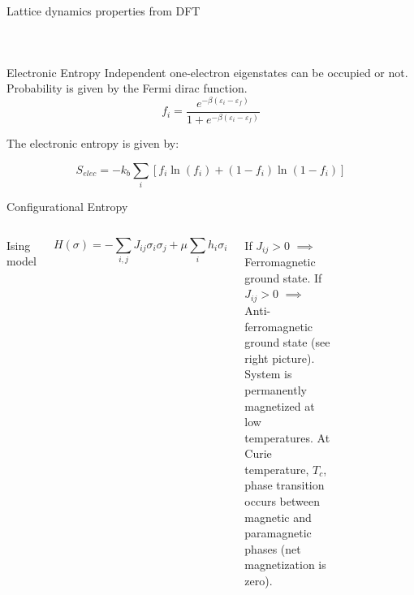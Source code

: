 \documentclass[aspectratio=169]{beamer}
\begin{document}
\begin{frame}{Lattice dynamics properties from DFT}
\begin{columns}
\begin{figure}
\end{figure} 

\end{columns} 

\end{frame} 

\begin{frame}{Electronic Entropy}
Independent one-electron eigenstates can be occupied or not. Probability is given by the Fermi dirac function.
\begin{equation*}
f_i = \frac{e^{-\beta(\varepsilon_i-\varepsilon_f)}}{1+e^{-\beta(\varepsilon_i-\varepsilon_f)}}
\end{equation*} 

The electronic entropy is given by:

\begin{equation*}
S_{elec} = -k_b \sum_i \left[ f_i \ln(f_i) + (1-f_i) \ln(1-f_i)\right]
\end{equation*} 
\end{frame} 

\begin{frame}{Configurational Entropy}

\begin{columns}
Ising model

\begin{equation*}
H(\sigma) = -\sum_{i,j} J_{ij} \sigma_i \sigma_j + \mu \sum_i h_i \sigma_i
\end{equation*} 

If $J_{ij} > 0$ $\implies$ Ferromagnetic ground state.\newline
\newline 
If $J_{ij} > 0$ $\implies$ Anti-ferromagnetic ground state (see right picture).\newline
\newline 
System is permanently magnetized at low temperatures.\newline
\newline 
At Curie temperature, $T_c$, phase transition occurs between magnetic and paramagnetic phases (net magnetization is zero). 

\begin{figure}
\end{figure} 

\end{columns} 
\end{frame} 
\end{document}
